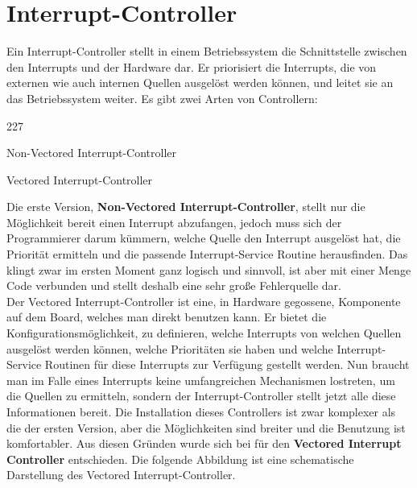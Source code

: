 \section{Interrupt-Controller}
Ein Interrupt-Controller stellt in einem Betriebssystem die Schnittstelle zwischen den Interrupts und der Hardware dar. Er priorisiert die Interrupts, die von externen wie auch internen Quellen ausgel\"ost werden k\"onnen, und leitet sie an das Betriebssystem weiter. Es gibt zwei Arten von Controllern:
\begin{dinglist}{227}
	\item{Non-Vectored Interrupt-Controller}
	\item{Vectored Interrupt-Controller}
\end{dinglist}
Die erste Version, \textbf{Non-Vectored Interrupt-Controller}, stellt nur die M\"oglichkeit bereit einen Interrupt abzufangen, jedoch muss sich der Programmierer darum k\"ummern, welche Quelle den Interrupt ausgel\"ost hat, die Priorit\"at ermitteln und die passende Interrupt-Service Routine herausfinden. Das klingt zwar im ersten Moment ganz logisch und sinnvoll, ist aber mit einer Menge Code verbunden und stellt deshalb eine sehr gro\ss e Fehlerquelle dar.\\
Der Vectored Interrupt-Controller ist eine, in Hardware gegossene, Komponente auf dem Board, welches man direkt benutzen kann. Er bietet die Konfigurationsm\"oglichkeit, zu definieren, welche Interrupts von welchen Quellen ausgel\"ost werden k\"onnen, welche Priorit\"aten sie haben und welche Interrupt-Service Routinen f\"ur diese Interrupts zur Verf\"ugung gestellt werden. Nun braucht man im Falle eines Interrupts keine umfangreichen Mechanismen lostreten, um die Quellen zu ermitteln, sondern der Interrupt-Controller stellt jetzt alle diese Informationen bereit. Die Installation dieses Controllers ist zwar komplexer als die der ersten Version, aber die M\"oglichkeiten sind breiter und die Benutzung ist komfortabler. Aus diesen Gr\"unden wurde sich bei \mops f\"ur den \textbf{Vectored Interrupt Controller} entschieden.
Die folgende Abbildung ist eine schematische Darstellung des Vectored Interrupt-Controller.


